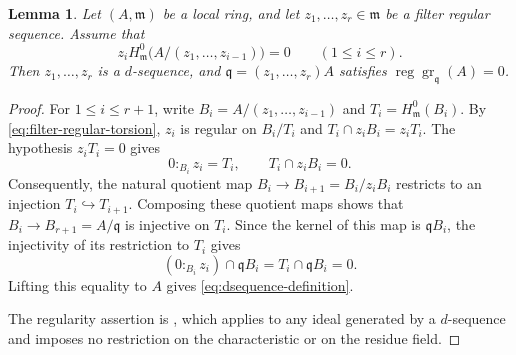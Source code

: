 \documentclass[11pt,reqno]{amsart}
\numberwithin{equation}{section}
\newtheorem{lemma}[theorem]{Lemma}
\theoremstyle{definition}
\newcommand{\m}{\mathfrak m}
\begin{document}
\begin{lemma}\label{lem:torsion-dsequence}
Let $(A,\m)$ be a local ring, and let $z_1,\ldots,z_r\in\m$
be a filter regular sequence. Assume that
\begin{equation}\label{eq:successive-torsion-killing}
 z_i H^0_{\m}\bigl(A/(z_1,\ldots,z_{i-1})\bigr)=0
 \qquad(1\le i\le r).
\end{equation}
Then $z_1,\ldots,z_r$ is a $d$-sequence, and
$\mathfrak q=(z_1,\ldots,z_r)A$ satisfies
$\operatorname{reg}\operatorname{gr}_{\mathfrak q}(A)=0$.
\end{lemma}
\begin{proof}
For $1\le i\le r+1$, write $B_i=A/(z_1,\ldots,z_{i-1})$ and
$T_i=H^0_{\m}(B_i)$.
By \eqref{eq:filter-regular-torsion}, $z_i$ is regular on $B_i/T_i$
and $T_i\cap z_iB_i=z_iT_i$. The hypothesis $z_iT_i=0$ gives
\[
 0:_{B_i}z_i=T_i,\qquad T_i\cap z_iB_i=0.
\]
Consequently, the natural quotient map
$B_i\to B_{i+1}=B_i/z_iB_i$ restricts to an injection
$T_i\hookrightarrow T_{i+1}$.
Composing these quotient maps shows that
$B_i\to B_{r+1}=A/\mathfrak q$ is injective on $T_i$.
Since the kernel of this map is $\mathfrak qB_i$, the
injectivity of its restriction to $T_i$ gives
\[
 (0:_{B_i}z_i)\cap\mathfrak qB_i
 =T_i\cap\mathfrak qB_i=0.
\]
Lifting this equality to $A$ gives
\eqref{eq:dsequence-definition}.

The regularity assertion is
\cite[Corollary~5.2(i)]{Trung1998}, which applies to any ideal
generated by a $d$-sequence and imposes no restriction on the
characteristic or on the residue field.
\end{proof}
\end{document}
